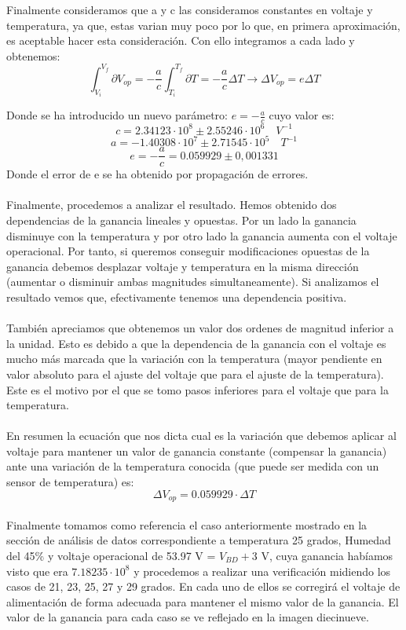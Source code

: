 \documentclass[11pt, a4paper]{article}
\begin{document}
Finalmente consideramos que a y c las consideramos constantes en voltaje y temperatura, ya que, estas varian muy poco por lo que, en primera aproximación, es aceptable hacer esta consideración. Con ello integramos a cada lado y obtenemos:
$$\int_{V_i}^{V_f} \partial V_{op}= - \frac{a}{c} \int_{T_i}^{T_f}\partial T = - \frac{a}{c} \Delta T \longrightarrow \Delta V_{op}= e \Delta T$$

Donde se ha introducido un nuevo parámetro: $e=-\frac{a}{c}$ cuyo valor es:
$$c=2.34123 \cdot 10^8 \pm 2.55246 \cdot 10^6 \quad V^{-1}$$
$$a=-1.40308 \cdot 10^7 \pm 2.71545 \cdot 10^5 \quad T^{-1}$$
$$e=-\frac{a}{c} = 0.059929 \pm 0,001331$$
Donde el error de e se ha obtenido por propagación de errores. 
\paragraph {}
Finalmente, procedemos a analizar el resultado. Hemos obtenido dos dependencias de la ganancia lineales y opuestas. Por un lado la ganancia disminuye con la temperatura y por otro lado la ganancia aumenta con el voltaje operacional. Por tanto, si queremos conseguir modificaciones opuestas de la ganancia debemos desplazar voltaje y temperatura en la misma dirección (aumentar o disminuir ambas magnitudes simultaneamente). Si analizamos el resultado vemos que, efectivamente tenemos una dependencia positiva.

\paragraph {}
También apreciamos que obtenemos un valor dos ordenes de magnitud inferior a la unidad. Esto es debido a que la dependencia de la ganancia con el voltaje es mucho más marcada que la variación con la temperatura (mayor pendiente en valor absoluto para el ajuste del voltaje que para el ajuste de la temperatura). Este es el motivo por el que se tomo pasos inferiores para el voltaje que para la temperatura. 

\paragraph {}
En resumen la ecuación que nos dicta cual es la variación que debemos aplicar al voltaje para mantener un valor de ganancia constante (compensar la ganancia) ante una variación de la temperatura conocida (que puede ser medida con un sensor de temperatura) es:
$$\Delta V_{op}=0.059929 \cdot \Delta T$$

\paragraph {}
Finalmente tomamos como referencia el caso anteriormente mostrado en la sección de análisis de datos correspondiente a temperatura 25 grados, Humedad del 45\% y voltaje operacional de 53.97 V = $V_{BD}+ 3$ V, cuya ganancia habíamos visto que era $7.18235 \cdot 10^8$ y procedemos a realizar una verificación midiendo los casos de 21, 23, 25, 27 y 29 grados. En cada uno de ellos se corregirá el voltaje de alimentación de forma adecuada para mantener el mismo valor de la ganancia. El valor de la ganancia para cada caso se ve reflejado en la imagen diecinueve. 
\end{document}
